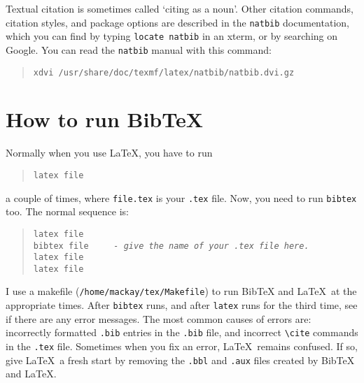 \documentclass[11pt]{article}
\begin{document}
 Textual citation is sometimes called `citing as a noun'. 
 Other citation commands, citation styles, and package options  
 are described in the {\tt{natbib}}
 documentation, which you can find by 
 typing {\tt{locate natbib}} in an xterm, or
 by  searching on Google.
 You can read the {\tt{natbib}} manual with this command: 
\begin{quote}
 \tt xdvi /usr/share/doc/texmf/latex/natbib/natbib.dvi.gz
\end{quote}

\section{How to run BibTeX}
 Normally when you use \LaTeX, you have to run 
\begin{quote}
 \tt latex file
\end{quote}
 a couple of times, where {\tt file.tex} is your {\tt{.tex}} file. 
 Now, you need to run {\tt{bibtex}} too. The normal sequence is:
\begin{quote}
 \tt latex file\\
 \tt bibtex file \ \ \ \ 
   {\em - give the name of your {\tt{.tex}} file here.} \\
 \tt latex file\\
 \tt latex file
\end{quote}
 I use a makefile ({\tt{/home/mackay/tex/Makefile}}) 
 to run  BibTeX and \LaTeX\ at the appropriate times.
 After {\tt{bibtex}} runs, and after 
   {\tt{latex}} runs  for the third time, 
 see if there are any error messages. 
 The most common 
 causes of errors are: incorrectly formatted 
 {\tt{.bib}} entries in the {\tt{.bib}} file,
 and incorrect {\verb+\cite+} commands in the 
 {\tt{.tex}} file. 
 Sometimes when you  fix an error, \LaTeX\  
 remains confused. If so, give  \LaTeX\ 
 a fresh start  by removing the {\tt{.bbl}}
 and {\tt{.aux}} files created by 
 BibTeX and \LaTeX.


\end{document}
